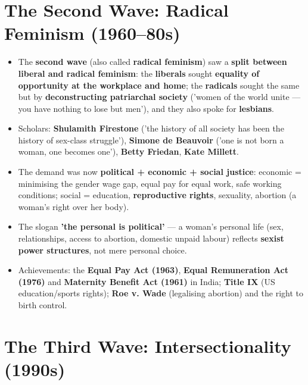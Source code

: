 \section{The Second Wave: Radical Feminism (1960--80s)}

\begin{KeyConcept}
\begin{itemize}
\item The \textbf{second wave} (also called \textbf{radical feminism}) saw a \textbf{split between liberal and radical feminism}: the \textbf{liberals} sought \textbf{equality of opportunity at the workplace and home}; the \textbf{radicals} sought the same but by \textbf{deconstructing patriarchal society} ('women of the world unite --- you have nothing to lose but men'), and they also spoke for \textbf{lesbians}.
\item Scholars: \textbf{Shulamith Firestone} ('the history of all society has been the history of sex-class struggle'), \textbf{Simone de Beauvoir} ('one is not born a woman, one becomes one'), \textbf{Betty Friedan}, \textbf{Kate Millett}.
\item The demand was now \textbf{political + economic + social justice}: economic = minimising the gender wage gap, equal pay for equal work, safe working conditions; social = education, \textbf{reproductive rights}, sexuality, abortion (a woman's right over her body).
\item The slogan \textbf{'the personal is political'} --- a woman's personal life (sex, relationships, access to abortion, domestic unpaid labour) reflects \textbf{sexist power structures}, not mere personal choice.
\item Achievements: the \textbf{Equal Pay Act (1963)}, \textbf{Equal Remuneration Act (1976)} and \textbf{Maternity Benefit Act (1961)} in India; \textbf{Title IX} (US education/sports rights); \textbf{Roe v. Wade} (legalising abortion) and the right to birth control.
\end{itemize}
\end{KeyConcept}

\section{The Third Wave: Intersectionality (1990s)}

